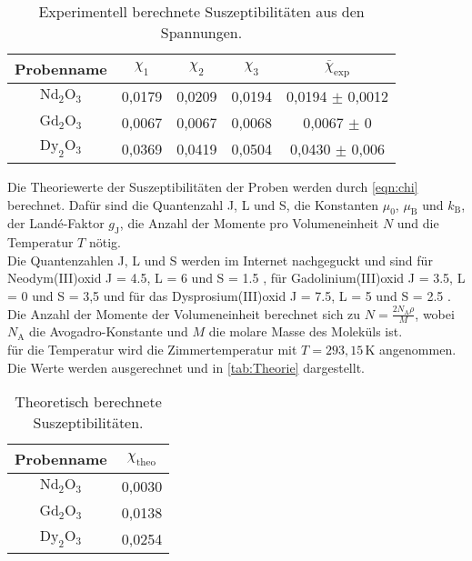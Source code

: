 \begin{table}
  \centering
  \caption{Experimentell berechnete Suszeptibilitäten aus den Spannungen.}
  \label{tab:Spannung}
  \begin{tabular}{c || c | c | c || c }
    \toprule
    Probenname & $\chi_1$ & $\chi_2$ & $\chi_3$ & $\overline{\chi}_{\mathrm{exp}}$ \\
    \hline
    $\mathrm{Nd}_2 \mathrm{O}_3$ & 0,0179 & 0,0209 & 0,0194 & 0,0194 $\pm$ 0,0012 \\
    $\mathrm{Gd}_2 \mathrm{O}_3$ & 0,0067 & 0,0067 & 0,0068 & 0,0067 $\pm$ 0 \\
    $\mathrm{Dy}_2 \mathrm{O}_3$ & 0,0369 & 0,0419 & 0,0504 & 0,0430 $\pm$ 0,006 \\
    \midrule
    \bottomrule
  \end{tabular}
\end{table}

Die Theoriewerte der Suszeptibilitäten der Proben werden durch \autoref{eqn:chi} berechnet. Dafür sind
die Quantenzahl J, L und S, die Konstanten $\mu_0$, $\mu_{\mathrm{B}}$ 
und $k_{\mathrm{B}}$, der Landé-Faktor $g_{\mathrm{J}}$, die Anzahl der Momente pro 
Volumeneinheit $N$ und die Temperatur $T$ nötig.\\
Die Quantenzahlen J, L und S werden im Internet nachgeguckt und sind für Neodym(III)oxid 
J = 4.5, L = 6 und S = 1.5 \cite{Nd}, für Gadolinium(III)oxid J = 3.5, L = 0 und S = 3,5 
und für das Dysprosium(III)oxid J = 7.5, L = 5 und S = 2.5 \cite{DyGd}.\\
Die Anzahl der Momente der Volumeneinheit berechnet sich zu $N = \frac{2 N_{\mathrm{A}} \rho }{M}$,
wobei $N_{\mathrm{A}}$ die Avogadro-Konstante und $M$ die molare Masse des Moleküls ist.\\
für die Temperatur wird die Zimmertemperatur mit $T = 293,15 \, \si{\kelvin}$ angenommen.\\
Die Werte werden ausgerechnet und in \autoref{tab:Theorie} dargestellt.

\begin{table}
  \centering
  \caption{Theoretisch berechnete Suszeptibilitäten.}
  \label{tab:Theorie}
  \begin{tabular}{c || c }
    \toprule
    Probenname & $\chi_{\mathrm{theo}}$ \\
    \hline
    $\mathrm{Nd}_2 \mathrm{O}_3$ & 0,0030 \\
    $\mathrm{Gd}_2 \mathrm{O}_3$ & 0,0138 \\
    $\mathrm{Dy}_2 \mathrm{O}_3$ & 0,0254 \\
    \midrule
    \bottomrule
  \end{tabular}
\end{table}

